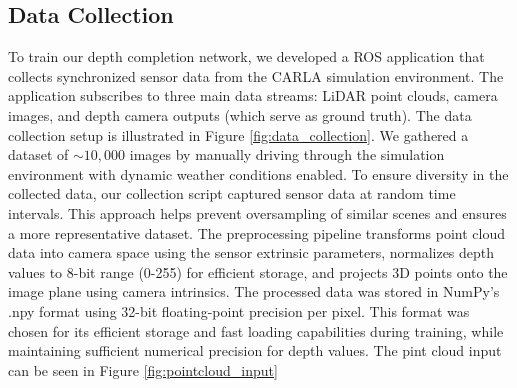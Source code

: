 \subsection{Data Collection}


To train our depth completion network, we developed a ROS application that collects synchronized sensor data from the CARLA simulation environment. The application subscribes to three main data streams: LiDAR point clouds, camera images, and depth camera outputs (which serve as ground truth). The data collection setup is illustrated in Figure \ref{fig:data_collection}.
We gathered a dataset of ${\sim}10,000$ images by manually driving through the simulation environment with dynamic weather conditions enabled. To ensure diversity in the collected data, our collection script captured sensor data at random time intervals. This approach helps prevent oversampling of similar scenes and ensures a more representative dataset.
The preprocessing pipeline transforms point cloud data into camera space using the sensor extrinsic parameters, normalizes depth values to 8-bit range (0-255) for efficient storage, and projects 3D points onto the image plane using camera intrinsics. The processed data was stored in NumPy's .npy format using 32-bit floating-point precision per pixel. This format was chosen for its efficient storage and fast loading capabilities during training, while maintaining sufficient numerical precision for depth values. The pint cloud input can be seen in Figure \ref{fig:pointcloud_input}
